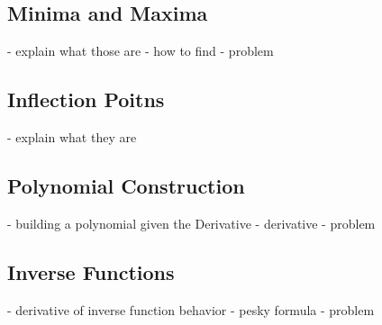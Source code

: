 \subsection{Minima and Maxima}
- explain what those are
- how to find
- problem
\subsection{Inflection Poitns}
- explain what they are
\subsection{Polynomial Construction}
- building a polynomial given the Derivative
- derivative
- problem
\subsection{Inverse Functions}
- derivative of inverse function behavior
- pesky formula
- problem